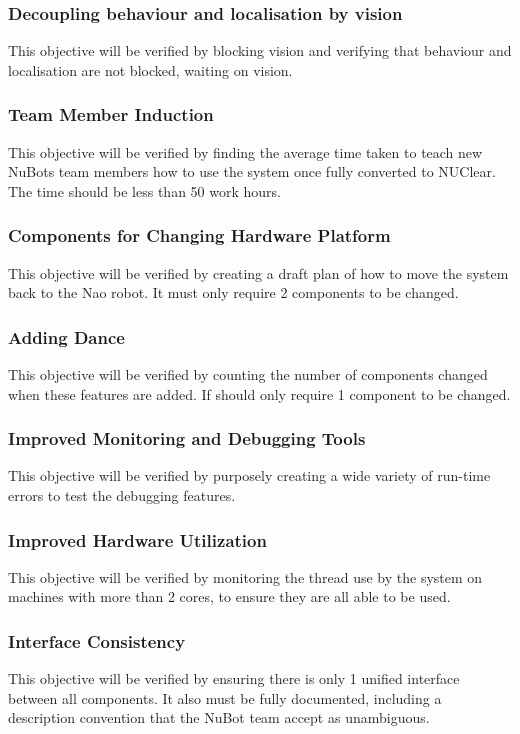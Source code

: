\documentclass[a4paper]{article}
\begin{document}
			\subsubsection{Decoupling behaviour and localisation by vision}
				This objective will be verified by blocking vision and verifying that behaviour and localisation are not blocked, waiting on vision.
			\subsubsection{Team Member Induction}
				This objective will be verified by finding the average time taken to teach new NuBots team members how to use the system once fully converted to NUClear. The time should be less than 50 work hours.
			\subsubsection{Components for Changing Hardware Platform}
				This objective will be verified by creating a draft plan of how to move the system back to the Nao robot. It must only require 2 components to be changed.
			\subsubsection{Adding Dance}
				This objective will be verified by counting the number of components changed when these features are added. If should only require 1 component to be changed.
			\subsubsection{Improved Monitoring and Debugging Tools}
				This objective will be verified by purposely creating a wide variety of run-time errors to test the debugging features.
			\subsubsection{Improved Hardware Utilization}
				This objective will be verified by monitoring the thread use by the system on machines with more than 2 cores, to ensure they are all able to be used.
			\subsubsection{Interface Consistency}
				This objective will be verified by ensuring there is only 1 unified interface between all components. It also must be fully documented, including a description convention that the NuBot team accept as unambiguous.
\end{document}
